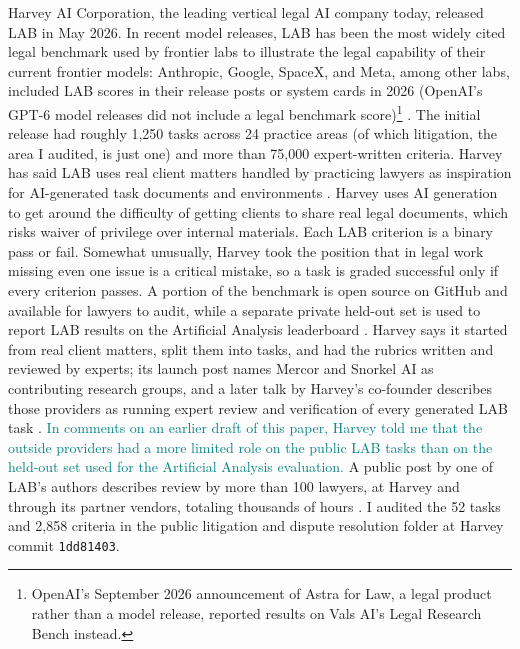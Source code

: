 \documentclass[11pt]{article}
\newcommand{\pending}[1]{\textcolor{teal}{#1}}
\newcommand{\labTasks}{52}
\newcommand{\labCriteria}{2{,}858}
\begin{document}
Harvey AI Corporation, the leading vertical legal AI company today, released LAB in May 2026. In recent model releases, LAB has been the most widely cited legal benchmark used by frontier labs to illustrate the legal capability of their current frontier models: Anthropic, Google, SpaceX, and Meta, among other labs, included LAB scores in their release posts or system cards in 2026 (OpenAI's GPT-6 model releases did not include a legal benchmark score)\footnote{OpenAI's September 2026 announcement of Astra for Law, a legal product rather than a model release, reported results on Vals AI's Legal Research Bench instead.} \citep{xaiGrok47,googleGemini4Argon,anthropicOpus55Card,metaMuseWonder,mistralLarge4}. The initial release had roughly 1,250 tasks across 24 practice areas (of which litigation, the area I audited, is just one) and more than 75,000 expert-written criteria. Harvey has said LAB uses real client matters handled by practicing lawyers as inspiration for AI-generated task documents and environments \citep{harveyLAB}. Harvey uses AI generation to get around the difficulty of getting clients to share real legal documents, which risks waiver of privilege over internal materials. Each LAB criterion is a binary pass or fail. Somewhat unusually, Harvey took the position that in legal work missing even one issue is a critical mistake, so a task is graded successful only if every criterion passes. A portion of the benchmark is open source on GitHub and available for lawyers to audit, while a separate private held-out set is used to report LAB results on the Artificial Analysis leaderboard \citep{labAAboard}. Harvey says it started from real client matters, split them into tasks, and had the rubrics written and reviewed by experts; its launch post names Mercor and Snorkel AI as contributing research groups, and a later talk by Harvey's co-founder describes those providers as running expert review and verification of every generated LAB task \citep{harveyLAB,harveyResearchLab}. \pending{In comments on an earlier draft of this paper, Harvey told me that the outside providers had a more limited role on the public LAB tasks than on the held-out set used for the Artificial Analysis evaluation.} A public post by one of LAB's authors describes review by more than 100 lawyers, at Harvey and through its partner vendors, totaling thousands of hours \citep{pereyraClarification}. I audited the \labTasks{} tasks and \labCriteria{} criteria in the public litigation and dispute resolution folder at Harvey commit \texttt{1dd81403}.
\end{document}

